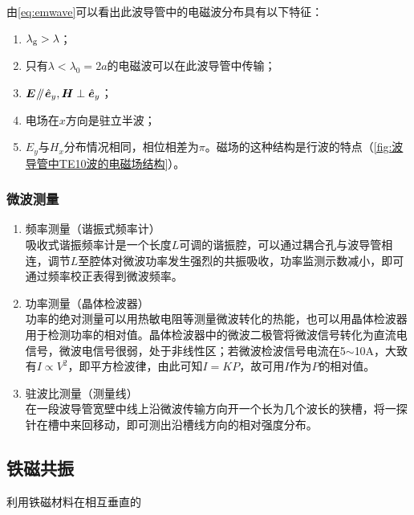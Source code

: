 		\par 由\cref{eq:emwave}可以看出此波导管中的电磁波分布具有以下特征：
		\begin{enumerate}
			\item $\lambda_{\rm g} >\lambda$；
			\item 只有$\lambda <\lambda_0=2a$的电磁波可以在此波导管中传输；
			\item $\boldsymbol{E}\mathbin{\!/\mkern-5mu/\!}\hat{\boldsymbol{e}}_{y},\boldsymbol{H}\perp\hat{\boldsymbol{e}}_{y}$；
			\item 电场在$x$方向是驻立半波；
			\item $E_y$与$H_x$分布情况相同，相位相差为$\pi$。磁场的这种结构是行波的特点（\cref{fig:波导管中TE10波的电磁场结构}）。
		\end{enumerate}
	\subsubsection{微波测量} %
		\label{ssub:微波测量}
		\begin{enumerate}
			\item 频率测量（谐振式频率计）\\
				吸收式谐振频率计是一个长度$L$可调的谐振腔，可以通过耦合孔与波导管相连，调节$L$至腔体对微波功率发生强烈的共振吸收，功率监测示数减小，即可通过频率校正表得到微波频率。
			\item 功率测量（晶体检波器）\\
				功率的绝对测量可以用热敏电阻等测量微波转化的热能，也可以用晶体检波器用于检测功率的相对值。晶体检波器中的微波二极管将微波信号转化为直流电信号，微波电信号很弱，处于非线性区；若微波检波信号电流在5$\sim$10\upmu A，大致有$I\propto V^2$，即平方检波律，由此可知$I=KP$，故可用$I$作为$P$的相对值。
			\item 驻波比测量（测量线）\\
				在一段波导管宽壁中线上沿微波传输方向开一个长为几个波长的狭槽，将一探针在槽中来回移动，即可测出沿槽线方向的相对强度分布。
		\end{enumerate}
\subsection{铁磁共振} %
	\label{sub:铁磁共振}
	利用铁磁材料在相互垂直的

